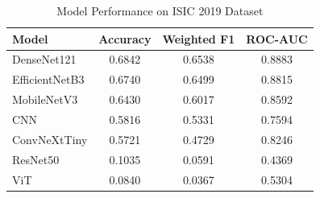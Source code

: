 \begin{table}
\caption{Model Performance on ISIC 2019 Dataset}
\label{tab:model-results}
\begin{tabular}{lccc}
\toprule
Model & Accuracy & Weighted F1 & ROC-AUC \\
\midrule
DenseNet121 & 0.6842 & 0.6538 & 0.8883 \\
EfficientNetB3 & 0.6740 & 0.6499 & 0.8815 \\
MobileNetV3 & 0.6430 & 0.6017 & 0.8592 \\
CNN & 0.5816 & 0.5331 & 0.7594 \\
ConvNeXtTiny & 0.5721 & 0.4729 & 0.8246 \\
ResNet50 & 0.1035 & 0.0591 & 0.4369 \\
ViT & 0.0840 & 0.0367 & 0.5304 \\
\bottomrule
\end{tabular}
\end{table}
